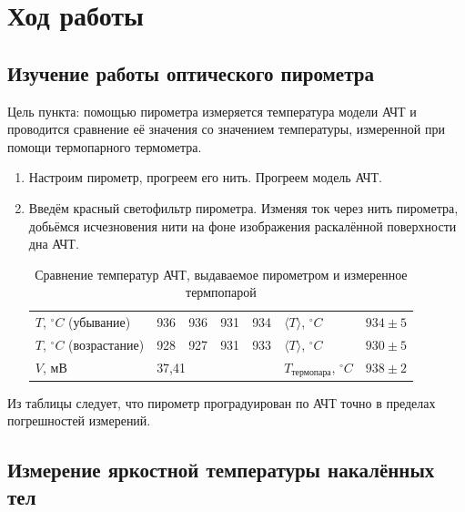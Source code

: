 \documentclass[a4paper, 12pt]{article}%
\begin{document}
\section{Ход работы}

\subsection{Изучение работы оптического пирометра}

    Цель пункта: помощью пирометра измеряется температура модели АЧТ и проводится сравнение её значения со значением температуры, измеренной при помощи термопарного термометра.

\begin{enumerate}
    \item Настроим пирометр, прогреем его нить. Прогреем модель АЧТ.
    \item Введём красный светофильтр пирометра. Изменяя ток через нить пирометра, добьёмся исчезновения нити на фоне изображения раскалённой поверхности дна АЧТ.

    \begin{table}[h]
        \centering
        \begin{center}
            \caption{Сравнение температур АЧТ, выдаваемое пирометром и измеренное термпопарой}
        \end{center}
        \begin{tabular}{|l|l|l|l|l|l|l|}
        \hline
        $T$, $^\circ C$ (убывание)          & 936  & 936 & 931 & 934 & $\langle T \rangle $, $^\circ C$ & $934 \pm 5$  \\ \cline{1-5} \cline{7-7} 
        $T$, $^\circ C$ (возрастание)       & 928  & 927 & 931 & 933 & $\langle T \rangle $, $^\circ C$ & $930 \pm 5$ \\ \hline
        $V$, мВ                            & \multicolumn{4}{l|}{37,41} & $T_{\text{термопара}}$, $^\circ C$              & $938 \pm 2$        \\ \hline
        \end{tabular}
        \label{table:comparison}
    \end{table}

\end{enumerate}

    Из таблицы следует, что пирометр проградуирован по АЧТ точно в пределах погрешностей измерений.

\subsection{Измерение яркостной температуры накалённых тел}
\end{document}
